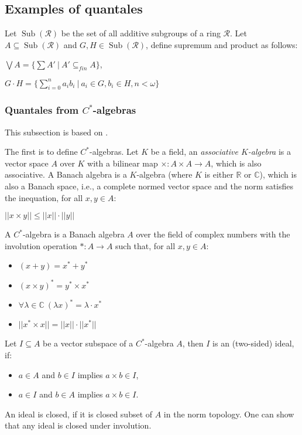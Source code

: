 \documentclass[a4paper]{article}
\theoremstyle{defin}
\theoremstyle{theorem}
\theoremstyle{claim}
\theoremstyle{prop}
\theoremstyle{lemma}
\theoremstyle{fact}
\theoremstyle{ex}
\theoremstyle{col}
\begin{document}
\subsection{Examples of quantales}

Let $\operatorname{Sub}(\mathcal{R})$ be the set of all additive subgroups of a ring $\mathcal{R}$. Let $A \subseteq \operatorname{Sub}(\mathcal{R})$ and $G, H \in \operatorname{Sub}(\mathcal{R})$, define supremum and product as follows:
\begin{center}
$\bigvee A = \{ \sum A' \: | \: A' \subseteq_{fin} A \}$,

$G \cdot H = \{ \sum \limits_{i = 0}^n a_i b_i \: | \: a_i \in G, b_i \in H, n < \omega \}$
\end{center}

\subsubsection{Quantales from $C^{*}$-algebras}

This subsection is based on \cite{mulvey2001quantisation}.

The first is to define $C^{*}$-algebras. Let $K$ be a field, an \emph{associative $K$-algebra} is a vector space $A$ over $K$ with a bilinear map $\times : A \times A \to A$, which is also associative. A Banach algebra is a $K$-algebra (where $K$ is either $\mathbb{R}$ or $\mathbb{C}$), which is also a Banach space, i.e., a complete normed vector space and the norm satisfies the inequation, for all $x, y \in A$:
\begin{center}
$||x \times y|| \leq ||x|| \cdot ||y||$
\end{center}

A $C^{*}$-algebra is a Banach algebra $A$ over the field of complex numbers with the involution operation $* : A \to A$ such that, for all $x, y \in A$:
\begin{itemize}
\item $(x + y) = x^* + y^*$
\item $(x \times y)^* = y^* \times x^*$
\item $\forall \lambda \in \mathbb{C} \: (\lambda x)^* = \lambda \cdot x^*$
\item $||x^* \times x|| = ||x||\cdot||x^*||$
\end{itemize}

Let $I \subseteq A$ be a vector subspace of a $C^*$-algebra $A$, then $I$ is an (two-sided) ideal, if:
\begin{itemize}
\item $a \in A$ and $b \in I$ implies $a \times b \in I$,
\item $a \in I$ and $b \in A$ implies $a \times b \in I$.
\end{itemize}
An ideal is closed, if it is closed subset of $A$ in the norm topology. One can show that any ideal is closed under involution.
\end{document}
